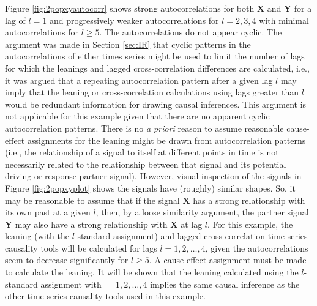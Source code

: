 Figure \ref{fig:2popxyautocorr} shows strong autocorrelations for both $\mathbf{X}$ and $\mathbf{Y}$ for a lag of $l=1$ and progressively weaker autocorrelations for $l=2,3,4$ with minimal autocorrelations for $l\ge 5$.  The autocorrelations do not appear cyclic.  The argument was made in Section \ref{sec:IR} that cyclic patterns in the autocorrelations of either times series might be used to limit the number of lags for which the leanings and lagged cross-correlation differences are calculated, i.e., it was argued that a repeating autocorrelation pattern after a given lag $l$ may imply that the leaning or cross-correlation calculations using lags greater than $l$ would be redundant information for drawing causal inferences.  This argument is not applicable for this example given that there are no apparent cyclic autocorrelation patterns.  There is no {\em a priori} reason to assume reasonable cause-effect assignments for the leaning might be drawn from autocorrelation patterns (i.e., the relationship of a signal to itself at different points in time is not necessarily related to the relationship between that signal and its potential driving or response partner signal).  However, visual inspection of the signals in Figure \ref{fig:2popxyplot} shows the signals have (roughly) similar shapes.  So, it may be reasonable to assume that if the signal $\mathbf{X}$ has a strong relationship with its own past at a given $l$, then, by a loose similarity argument, the partner signal $\mathbf{Y}$ may also have a strong relationship with $\mathbf{X}$ at lag $l$.  For this example, the leaning (with the $l$-standard assignment) and lagged cross-correlation time series causality tools will be calculated for lags $l=1,2,\ldots,4$, given the autocorrelations seem to decrease significantly for $l\ge 5$.  A cause-effect assignment must be made to calculate the leaning.  It will be shown that the leaning calculated using the $l$-standard assignment with $=1,2,\ldots,4$ implies the same causal inference as the other time series causality tools used in this example.  

